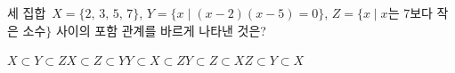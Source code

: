 세 집합~$X=\{2,\,3,\,5,\,7\}$, $Y=\{x \mid (x-2)(x-5)=0\}$, $Z=\{x \mid x$는 $7$보다 작은 소수$\}$ 사이의 포함 관계를 바르게 나타낸 것은?
\begin{choices32}{$X\subset Y\subset Z$}{$X\subset Z\subset Y$}{$Y\subset X\subset Z$}{$Y\subset Z\subset X$}{$Z\subset Y\subset X$}\end{choices32}
